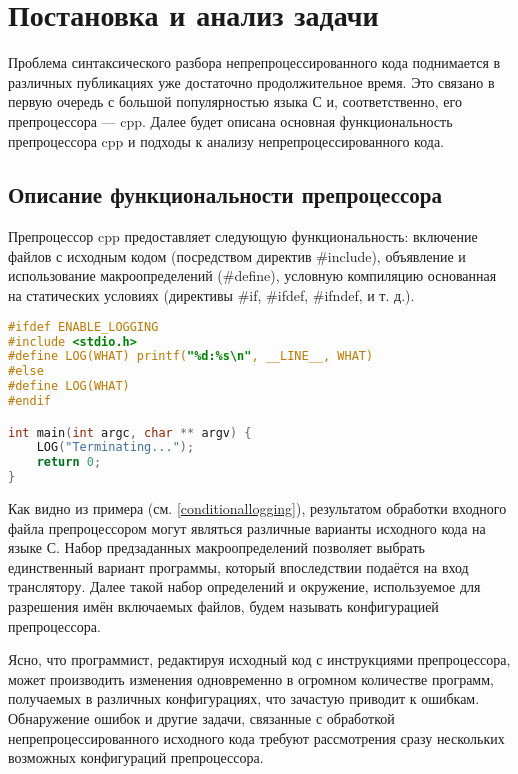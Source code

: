 \clearpage

\section{Постановка и анализ задачи}

Проблема синтаксического разбора непрепроцессированного кода поднимается в различных публикациях уже достаточно продолжительное время. Это связано в первую очередь с большой популярностью языка С и, соответственно, его препроцессора --- cpp. Далее будет описана основная функциональность препроцессора cpp и подходы к анализу непрепроцессированного кода.

\subsection{Описание функциональности препроцессора}

Препроцессор cpp предоставляет следующую функциональность: включение файлов с исходным кодом (посредством директив \#include), объявление и использование макроопределений (\#define), условную компиляцию основанная на статических условиях (директивы \#if, \#ifdef, \#ifndef, и т. д.).

\begin{lstlisting}[caption={Условная компиляция},label=conditionallogging,language=C,basicstyle=\small]
#ifdef ENABLE_LOGGING 
#include <stdio.h>
#define LOG(WHAT) printf("%d:%s\n", __LINE__, WHAT)
#else
#define LOG(WHAT) 
#endif

int main(int argc, char ** argv) {
	LOG("Terminating...");
	return 0;	
}
\end{lstlisting}

Как видно из примера (см. \autoref{conditionallogging}), результатом обработки входного файла препроцессором могут являться различные варианты исходного кода на языке С. Набор предзаданных макроопределений позволяет выбрать единственный вариант программы, который впоследствии подаётся на вход транслятору. Далее такой набор определений и окружение, используемое для разрешения имён включаемых файлов, будем называть конфигурацией препроцессора.

Ясно, что программист, редактируя исходный код с инструкциями препроцессора, может производить изменения одновременно в огромном количестве программ, получаемых в различных конфигурациях, что зачастую приводит к ошибкам\cite{ribeiro}. Обнаружение ошибок и другие задачи, связанные с обработкой непрепроцессированного исходного кода требуют рассмотрения сразу нескольких возможных конфигураций препроцессора.

